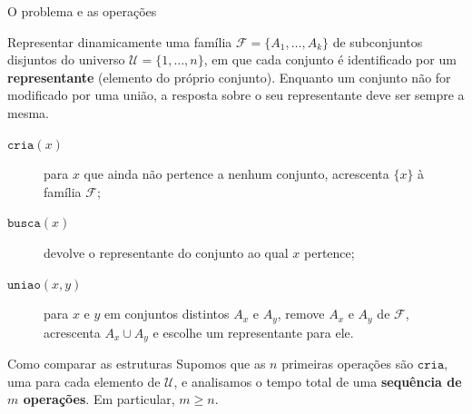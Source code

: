 \documentclass[aspectratio=169,10pt]{beamer}
\newcommand{\Cria}{\mathtt{cria}}
\newcommand{\Busca}{\mathtt{busca}}
\newcommand{\Uniao}{\mathtt{uniao}}
\begin{document}
 \begin{frame}[t]{O problema e as operações}

   Representar dinamicamente uma família $\mathcal F=\{A_1,\dots,A_k\}$
   de subconjuntos disjuntos do universo $\mathcal U=\{1,\dots,n\}$, em
   que cada conjunto é identificado por um \textbf{representante}
   (elemento do próprio conjunto).  Enquanto um conjunto não for
   modificado por uma união, a resposta sobre o seu representante deve
   ser sempre a mesma.
 
   \medskip
   \begin{description}
   \item[$\Cria(x)$] para $x$ que ainda não pertence a nenhum conjunto,
     acrescenta $\{x\}$ à família $\mathcal F$;
   \item[$\Busca(x)$] devolve o representante do conjunto ao qual $x$
     pertence;
   \item[$\Uniao(x,y)$] para $x$ e $y$ em conjuntos distintos $A_x$ e
     $A_y$, remove $A_x$ e $A_y$ de $\mathcal F$, acrescenta
     $A_x\cup A_y$ e escolhe um representante para ele.
   \end{description}
 
   \medskip
   \begin{alertblock}{Como comparar as estruturas}
     Supomos que as $n$ primeiras operações são $\Cria$, uma para cada
     elemento de $\mathcal U$, e analisamos o tempo total de uma
     \textbf{sequência de $m$ operações}. Em particular, $m\geq n$.
   \end{alertblock}
 \end{frame}
 
\end{document}
